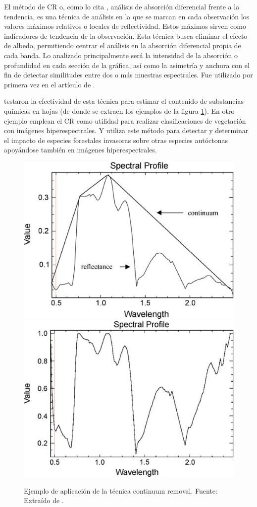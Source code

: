 El método de \ac{CR} o, como lo cita \cite{chuvieco2002teledeteccion}, análisis de absorción diferencial frente a la tendencia, es una técnica de análisis en la que se marcan en cada observación los valores máximos relativos o locales de reflectividad. Estos máximos sirven como indicadores de tendencia de la observación. Esta técnica busca eliminar el efecto de albedo, permitiendo centrar el análisis en la absorción diferencial propia de cada banda. Lo analizado principalmente será la intensidad de la absorción o profundidad en cada sección de la gráfica, así como la asimetría y anchura con el fin de detectar similitudes entre dos o más muestras espectrales. Fue utilizado por primera vez en el artículo de \cite{kokaly1999spectroscopic}.\Sep

\cite{huang2004estimating} testaron la efectividad de esta técnica para estimar el contenido de substancias químicas en hojas (de donde se extraen los ejemplos de la figura \ref{fig:ejemploCR}). En otro ejemplo \cite{filippi2007effect} emplean el \ac{CR} como utilidad para realizar clasificaciones de vegetación con imágenes hiperespectrales. Y \cite{underwood2003mapping} utiliza este método para detectar y determinar el impacto de especies forestales invasoras sobre otras especies autóctonas apoyándose también en imágenes hiperespectrales.\Sep

\begin{figure}
	\centering
	\includegraphics[width=0.5\linewidth]{./Imagenes/CR1.eps}
	\includegraphics[width=0.5\linewidth]{./Imagenes/CR2.eps}
	\caption[Continuum Removal ejemplo]{Ejemplo de aplicación de la técnica continuum removal. Fuente: Extraído de \cite{huang2004estimating}.}
	\label{fig:ejemploCR}
\end{figure}

